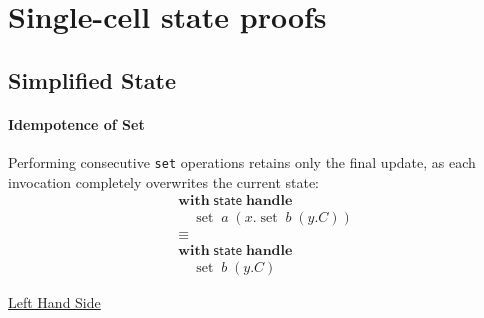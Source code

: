 \documentclass[logo,bsc,singlespacing,parskip]{infthesis}
\begin{document}
\appendix

\chapter{Single-cell state proofs} 

\section{Simplified State} \label{full-simplified-single-cell-state-proof}

\subsubsection*{Idempotence of Set}
Performing consecutive \lstinline{set} operations retains only the final update, as each invocation completely overwrites the current state:
\[
\begin{aligned}
    &\mathsf{\textbf{with}} \; \mathsf{state} \; \mathsf{\textbf{handle}} \\
    &\quad \operatorname{set} \; a \; (x. \operatorname{set} \; b \; (y. C)) \\
    &\equiv \\
    &\mathsf{\textbf{with}} \; \mathsf{state} \; \mathsf{\textbf{handle}} \\
    &\quad \operatorname{set} \; b \; (y. C)
\end{aligned}
\]

\underline{Left Hand Side}
\end{document}
